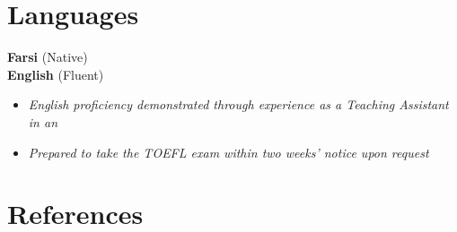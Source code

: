 \documentclass[a4paper,11pt]{article}
\newcommand{\resumeItemListStart}{\begin{justify}\begin{itemize}[leftmargin=3ex, rightmargin=2ex, noitemsep,labelsep=1.2mm,itemsep=0mm]\small}
\newcommand{\resumeItemListEnd}{\end{itemize}\end{justify}\vspace{-2mm}}
\begin{document}
\section{\textbf{Languages}}
 \begin{itemize}[leftmargin=0.05in, label={}]
    \small{\item{
     \textbf{Farsi}{ (Native)}\\
     \textbf{English}{ (Fluent)}
      \vspace{-3.0mm}
     \resumeItemListStart
    \item {\textit{English proficiency demonstrated through experience as a Teaching Assistant in an \href{https://www.youtube.com/watch?v=ixk8vYhtaJM}{}}}
    \item {\textit{Prepared to take the TOEFL exam within two weeks' notice upon request}}


    \resumeItemListEnd
    }}
 \end{itemize}
 \vspace{-5.5mm}

 
\section{\textbf{References}}
\end{document}
